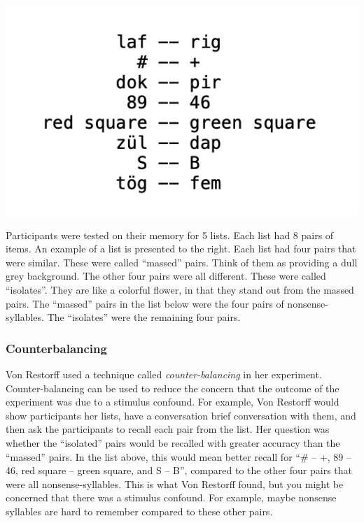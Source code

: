 \documentclass[
  oneside,
  12pt]{crumpbook}
\newenvironment{floatright50}{%
  \wrapfigure{R}{.5\textwidth}%
  }{%
  \endwrapfigure}
\begin{document}
\begin{floatright50}
\includegraphics[width=1\linewidth]{imgs/Von_restorff_Stimuli}

\end{floatright50}

Participants were tested on their memory for 5 lists. Each list had 8 pairs of items. An example of a list is presented to the right. Each list had four pairs that were similar. These were called ``massed'' pairs. Think of them as providing a dull grey background. The other four pairs were all different. These were called ``isolates''. They are like a colorful flower, in that they stand out from the massed pairs. The ``massed'' pairs in the list below were the four pairs of nonsense-syllables. The ``isolates'' were the remaining four pairs.

\hypertarget{counterbalancing}{%
\subsubsection{Counterbalancing}\label{counterbalancing}}

Von Restorff used a technique called \emph{counter-balancing} in her experiment. Counter-balancing can be used to reduce the concern that the outcome of the experiment was due to a stimulus confound. For example, Von Restorff would show participants her lists, have a conversation brief conversation with them, and then ask the participants to recall each pair from the list. Her question was whether the ``isolated'' pairs would be recalled with greater accuracy than the ``massed'' pairs. In the list above, this would mean better recall for ``\# -- +, 89 -- 46, red square -- green square, and S -- B'', compared to the other four pairs that were all nonsense-syllables. This is what Von Restorff found, but you might be concerned that there was a stimulus confound. For example, maybe nonsense syllables are hard to remember compared to these other pairs.
\end{document}
